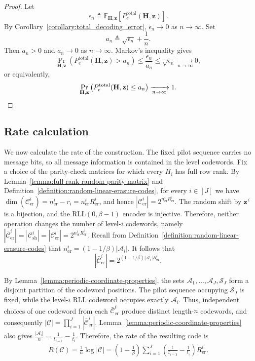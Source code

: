\documentclass[journal,letterpaper,onecolumn,11pt]{IEEEtran}
\newcommand{\cA}{\mathcal{A}}
\newcommand{\cC}{\mathcal{C}}
\newcommand{\cS}{\mathcal{S}}
\newcommand{\boldz}{\mathbf{z}}
\newcommand{\boldH}{\mathbf{H}}
\begin{document}
\begin{proof}
Let
\[
\epsilon_n
\triangleq
\mathbb E_{\boldH,\boldz}
\left[
P_e^{\mathrm{total}}(\boldH,\boldz)
\right].
\]
By Corollary~\ref{corollary:total_decoding_error},
\(\epsilon_n\to0\) as $n\to\infty$. Set
\[
a_n\triangleq\sqrt{\epsilon_n}+\frac{1}{n}.
\]
Then \(a_n>0\) and \(a_n\to0\) as $n\to\infty$. Markov's inequality gives
\[
\Pr_{\boldH,\boldz}\left(
P_e^{\mathrm{total}}(\boldH,\boldz)>a_n
\right)
\leq
\frac{\epsilon_n}{a_n}
\leq
\sqrt{\epsilon_n}
\xrightarrow[n\to\infty]{}0,
\]
or equivalently,
\[
\Pr_{\boldH,\boldz}\left(
P_e^{\mathrm{total}}(\boldH,\boldz)\leq a_n
\right)
\xrightarrow[n\to\infty]{}1.\qedhere
\]
\end{proof}
\subsection{Rate calculation}\label{subsection:rate-calculation}

We now calculate the rate of the construction.  The fixed pilot sequence
carries no message bits, so all message information is contained in the
level codewords.  Fix a choice of the parity-check matrices for which
every \(H_i\) has full row rank.  By
Lemma~\ref{lemma:full rank random parity matrix} and
Definition~\ref{definition:random-linear-erasure-codes}, for every
\(i\in[J]\) we have
$
\dim(\cC_{\mathrm{er}}^i)
=
n_{\mathrm{er}}^i-r_i
=
n_{\mathrm{er}}^iR_{\mathrm{er}}^i
$, and hence
$
|\cC_{\mathrm{er}}^i|
=
2^{n_{\mathrm{er}}^iR_{\mathrm{er}}^i}.
$
The random shift by \(\boldz^{\,i}\) is a bijection, and the
\(\mathrm{RLL}(0,\beta-1)\) encoder is injective.  
Therefore, neither
operation changes the number of level-\(i\) codewords, namely
$
|\bar{\cC}_{\mathrm{er}}^i|
=
|\cC_{\mathrm{sh}}^i|
=
|\cC_{\mathrm{er}}^i|
=
2^{n_{\mathrm{er}}^iR_{\mathrm{er}}^i}.
$
Recall from Definition~\ref{definition:random-linear-erasure-codes} that
\(n_{\mathrm{er}}^i=(1-1/\beta)|\cA_i|\).  It follows that
\[
|\bar{\cC}_{\mathrm{er}}^i|
=
2^{(1-1/\beta)|\cA_i|R_{\mathrm{er}}^i}.
\]

By Lemma~\ref{lemma:periodic-coordinate-properties}, the sets
\(\cA_1,\ldots,\cA_J,\cS_J\) form a disjoint partition of the codeword
positions.  The pilot sequence occupying \(\cS_J\) is fixed, while the
level-\(i\) RLL codeword occupies exactly \(\cA_i\).  Thus, independent
choices of one codeword from each
\(\bar{\cC}_{\mathrm{er}}^i\) produce distinct length-\(n\) codewords,
and consequently
$
|\cC|
=
\prod_{i=1}^{J}|\bar{\cC}_{\mathrm{er}}^i|.
$
Lemma~\ref{lemma:periodic-coordinate-properties} also gives
$
\frac{|\cA_i|}{n}
=
\frac{1}{t_{i-1}}-\frac{1}{t_i}.
$
Therefore, the rate of the resulting code is
\begin{align}
R(\cC)
=
\frac{1}{n}\log |\cC| 
=
\left(1-\frac{1}{\beta}\right)
\sum_{i=1}^{J}
\left(
\frac{1}{t_{i-1}}-\frac{1}{t_i}
\right)
R_{\mathrm{er}}^i.
\label{eq:multilevel-code-rate}
\end{align}
\end{document}
